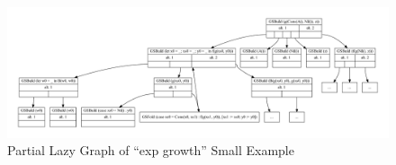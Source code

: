 \documentclass[submission,copyright,creativecommons]{eptcs}
\begin{document}
%

\begin{figure}
  \centering
  \includegraphics[width=\textwidth]{inc/expGrowthSmallGraphSetPartial.pdf}
  \caption{Partial Lazy Graph of ``exp growth'' Small Example}\label{fig:ExpGrowthSmallPartialGraphSet}
\end{figure}
\end{document}
